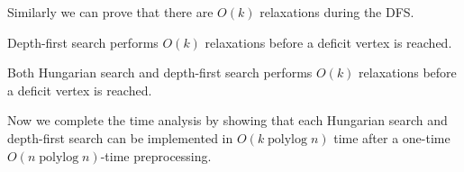 \documentclass[a4paper,UKenglish]{socg-lipics-v2018}
\def\polylog{\mathop{\mathrm{polylog}}}
\theoremstyle{plain}
\numberwithin{figure}{section}
\begin{document}
\begin{toappendix}
Similarly we can prove that there are $O(k)$ relaxations during the DFS.

\begin{corollary}
\label{corollary:goldberg_dfs_length}
Depth-first search performs $O(k)$ relaxations before a deficit vertex is reached.
\end{corollary}

\end{toappendix}

\begin{lemma}
Both Hungarian search and depth-first search performs $O(k)$ relaxations before a deficit vertex is reached.
\end{lemma}


Now we complete the time analysis
by showing that each Hungarian search and depth-first search can be implemented in $O(k \polylog n)$ time after a one-time $O(n \polylog n)$-time preprocessing.
\end{document}
